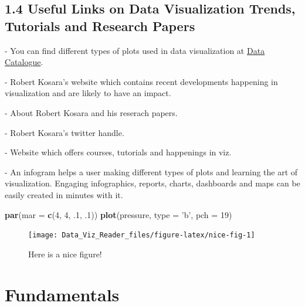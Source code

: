 \documentclass[]{book}
\newenvironment{Shaded}{\begin{snugshade}}{\end{snugshade}}
\newcommand{\KeywordTok}[1]{\textcolor[rgb]{0.13,0.29,0.53}{\textbf{#1}}}
\newcommand{\DataTypeTok}[1]{\textcolor[rgb]{0.13,0.29,0.53}{#1}}
\newcommand{\DecValTok}[1]{\textcolor[rgb]{0.00,0.00,0.81}{#1}}
\newcommand{\StringTok}[1]{\textcolor[rgb]{0.31,0.60,0.02}{#1}}
\newcommand{\NormalTok}[1]{#1}
\theoremstyle{definition}
\theoremstyle{definition}
\theoremstyle{definition}
\theoremstyle{remark}
\begin{document}
\citep{history_viz}

\section{1.4 Useful Links on Data Visualization Trends, Tutorials and
Research
Papers}\label{useful-links-on-data-visualization-trends-tutorials-and-research-papers}

\citep{charts_viz} - You can find different types of plots used in data
visualization at \href{https://datavizcatalogue.com/search.html}{Data
Catalogue}.

\citep{eagereyes_viz} - Robert Kosara's website which contains recent
developments happening in visualization and are likely to have an
impact.

\citep{research_viz} - About Robert Kosara and his reserach papers.

\citep{twitter_Kosara} - Robert Kosara's twitter handle.

\citep{flowingdata} - Website which offers courses, tutorials and
happenings in viz.

\citep{infogram} - An infogram helps a user making different types of
plots and learning the art of visualization. Engaging infographics,
reports, charts, dashboards and maps can be easily created in minutes
with it.

\begin{Shaded}
\begin{Highlighting}[]
\KeywordTok{par}\NormalTok{(}\DataTypeTok{mar =} \KeywordTok{c}\NormalTok{(}\DecValTok{4}\NormalTok{, }\DecValTok{4}\NormalTok{, .}\DecValTok{1}\NormalTok{, .}\DecValTok{1}\NormalTok{))}
\KeywordTok{plot}\NormalTok{(pressure, }\DataTypeTok{type =} \StringTok{'b'}\NormalTok{, }\DataTypeTok{pch =} \DecValTok{19}\NormalTok{)}
\end{Highlighting}
\end{Shaded}

\begin{figure}

{\centering \texttt{[image: Data\_Viz\_Reader\_files/figure-latex/nice-fig-1]} 

}

\caption{Here is a nice figure!}\label{fig:nice-fig}
\end{figure}

\chapter{Fundamentals}\label{fundamentals}
\end{document}
